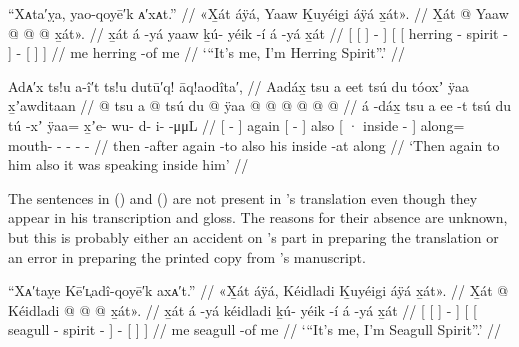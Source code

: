 \ex\label{ex:100-160-its-me-herring}%
%
\begingl
	\glpreamble	“Xᴀta′ỵa, yao-qoyē′k ᴀ′xᴀt.” //
	\glpreamble	«\!X̱át áÿá, Yaaw Ḵuyéigi áÿá x̱át\!». //
	\gla	{} {} X̱át {}  @ {} {} 
		{} {} Yaaw  @ {} @ {} {}
			 @ {}
			{} x̱át\!». {} {} //
	\glb	{} {} x̱át {} á -yá {}
		{} {} yaaw ḵú- yéik -í {} 
			á -yá
			{} x̱át {} {} //
	\glc	{}[ {}[  {}]  - {}]
		{}[ {}[ herring - spirit - {}]
			 -
			{}[  {}] {}] //
	\gld	{} {} me {}  {} {} 
		{} {} herring  {} -of {} 
			 {} 
			{} me {} {} //
	\glft	‘“It’s me, I’m Herring Spirit”.’
		//
\endgl
\xe

\ex\label{ex:100-161-again-speaking-inside-him}%
%
\begingl
	\glpreamble	Adᴀ′x ts!u a-î′t ts!u dutū′q! āq!aodîta′, //
	\glpreamble	Aadáx̱ tsu a eet tsú du tóoxʼ ÿaa x̱ʼawditaan //
	\gla	{}  @ {} {}
		tsu {} a  @ {} {} tsú
		{} du  @ {} {}
		ÿaa @  @ {} @ {} @ {} @ {} @ {} //
	\glb	{} á -dáx̱ {}
		tsu {} a ee -t {} tsú
		{} du tú -xʼ {}
		ÿaa= x̱ʼe- wu- d- i-  -μμL //
	\glc	{}[  - {}]
		again {}[   - {}] also
		{}[ · inside - {}]
		along= mouth- - - -  - //
	\gld	{} then -after {}
		again {}  {} -to {} also
		{} his inside -at {} 
		along  {} {} {} {} {} {} {} //
	\glft	‘Then again to him also it was speaking inside him’
		//
\endgl
\xe

The sentences in (\lastx) and (\nextx) are not present in \citeauthor{swanton:1909}’s translation even though they appear in his transcription and gloss.
The reasons for their absence are unknown, but this is probably either an accident on \citeauthor{swanton:1909}’s part in preparing the translation or an error in preparing the printed copy from \citeauthor{swanton:1909}’s manuscript.

\ex\label{ex:100-162-its-me-seagull}%
%
\begingl
	\glpreamble	“Xᴀ′taỵe Kē′ʟ̣adî-qoyē′k axᴀ′t.” //
	\glpreamble	«\!X̱át áÿá, Kéidladi Ḵuyéigi áÿá x̱át\!». //
	\gla	{} {} X̱át {}  @ {} {} 
		{} {} Kéidladi  @ {} @ {} {}
			 @ {}
			{} x̱át\!». {} {} //
	\glb	{} {} x̱át {} á -yá {}
		{} {} kéidladi ḵú- yéik -í {} 
			á -yá
			{} x̱át {} {} //
	\glc	{}[ {}[  {}]  - {}]
		{}[ {}[ seagull - spirit - {}]
			 -
			{}[  {}] {}] //
	\gld	{} {} me {}  {} {} 
		{} {} seagull  {} -of {} 
			 {} 
			{} me {} {} //
	\glft	‘“It’s me, I’m Seagull Spirit”.’
		//
\endgl
\xe

